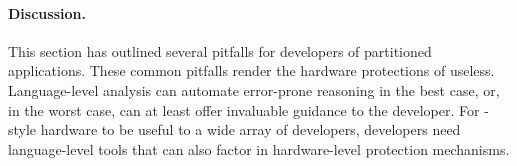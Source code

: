 



\paragraph{Discussion.}  This
section has outlined several pitfalls for developers of partitioned applications.
These common pitfalls render the hardware protections of \sgx{} useless.
Language-level analysis can automate error-prone reasoning in the best case, or, in the worst case, 
can at least offer invaluable guidance to the developer.  For \sgx{}-style
hardware to be useful to a wide array of developers, developers need language-level
tools that can also factor in hardware-level protection mechanisms.



